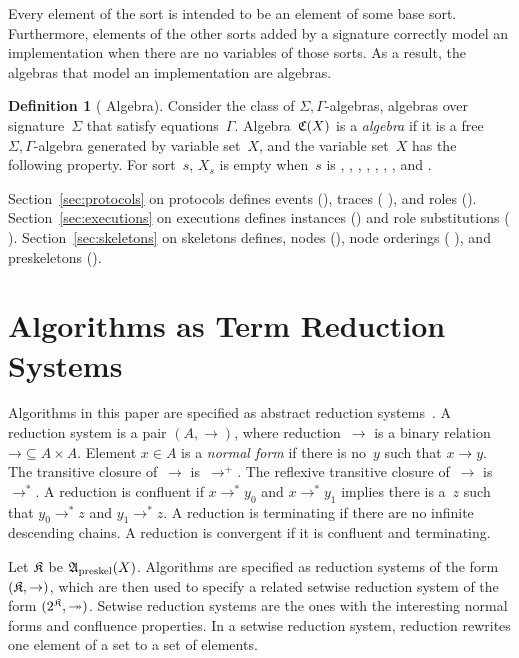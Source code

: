 \documentclass[12pt]{article}
\theoremstyle{definition}
\newtheorem{defn}{Definition}[section]
\begin{document}
Every element of the sort  is intended to be an element of
some base sort.  Furthermore, elements of the other sorts added by a
{\cpsa} signature correctly model an implementation when there are no
variables of those sorts.  As a result, the algebras that model an
implementation are {\cpsa} algebras.

\begin{defn}[{\cpsa} Algebra]\label{def:cpsa algebra}
 Consider the class of
$\Sigma,\Gamma$-algebras, algebras over {\cpsa} signature~$\Sigma$
that satisfy equations~$\Gamma$.  Algebra~$\mathfrak C(X)$ is a
\emph{{\cpsa} algebra} if it is a free $\Sigma,\Gamma$-algebra
generated by variable set~$X$, and the variable set~$X$ has the
following property.  For sort~$s$, $X_s$ is empty when~$s$ is
, , , , ,
, , and .
\end{defn}

Section~\ref{sec:protocols} on protocols defines events (),
traces ( ), and roles ().
Section~\ref{sec:executions} on executions defines instances
() and role substitutions ( ).
Section~\ref{sec:skeletons} on skeletons defines, nodes (),
node orderings ( ), and preskeletons
().

\section{Algorithms as Term Reduction Systems}\label{sec:algorithms}

Algorithms in this paper are specified as abstract
reduction systems~\cite[Chapter~2]{BaaderNipkow98}.  A reduction
system is a pair $(A,\to)$, where reduction~$\to$ is a binary relation
$\mathord{\to}\subseteq A\times A$.  Element $x\in A$ is a
\emph{normal form} if there is no~$y$ such that $x\to y$.  The
transitive closure of~$\to$ is~$\to^+$.  The reflexive transitive
closure of~$\to$ is~$\to^\ast$.  A reduction is confluent if
$x\to^\ast y_0$ and $x\to^\ast y_1$ implies there is a~$z$ such that
$y_0\to^\ast z$ and $y_1\to^\ast z$.  A reduction is terminating if
there are no infinite descending chains.  A reduction is convergent if
it is confluent and terminating.

Let $\mathfrak K$ be $\mathfrak A_{\operatorname{\mathrm{preskel}}}(X)$.  Algorithms are
specified as reduction systems of the form $(\mathfrak K,\to)$, which are
then used to specify a related setwise reduction system of the form
$(2^{\mathfrak K},\mathord\twoheadrightarrow)$.  Setwise reduction
systems are the ones with the interesting normal forms and confluence
properties.  In a setwise reduction system, reduction rewrites one
element of a set to a set of elements.
\end{document}
